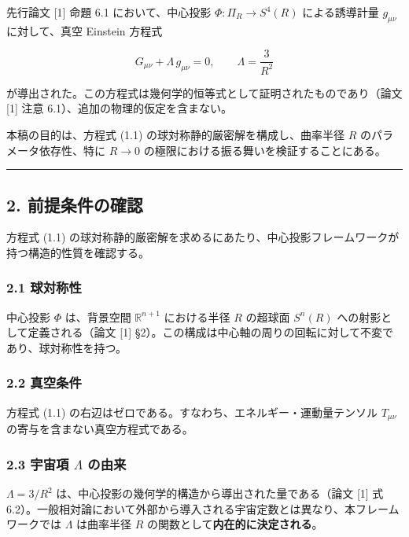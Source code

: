 \documentclass[a4paper,11pt]{ltjsarticle}
\theoremstyle{definition}
\begin{document}
先行論文 {[}1{]} 命題 6.1 において、中心投影 \(\Phi : \Pi_R \to S^4(R)\)
による誘導計量 \(g_{\mu\nu}\) に対して、真空 Einstein 方程式

\[G_{\mu\nu} + \Lambda\, g_{\mu\nu} = 0, \qquad \Lambda = \frac{3}{R^2} \tag{1.1}\]

が導出された。この方程式は幾何学的恒等式として証明されたものであり（論文
{[}1{]} 注意 6.1）、追加の物理的仮定を含まない。

本稿の目的は、方程式 (1.1) の球対称静的厳密解を構成し、曲率半径 \(R\)
のパラメータ依存性、特に \(R \to 0\)
の極限における振る舞いを検証することにある。

\begin{center}\rule{0.5\linewidth}{0.5pt}\end{center}

\subsection{2.
前提条件の確認}\label{ux524dux63d0ux6761ux4ef6ux306eux78baux8a8d}

方程式 (1.1)
の球対称静的厳密解を求めるにあたり、中心投影フレームワークが持つ構造的性質を確認する。

\subsubsection{2.1 球対称性}\label{ux7403ux5bfeux79f0ux6027}

中心投影 \(\Phi\) は、背景空間 \(\mathbb{R}^{n+1}\) における半径 \(R\)
の超球面 \(S^n(R)\) への射影として定義される（論文 {[}1{]}
§2）。この構成は中心軸の周りの回転に対して不変であり、球対称性を持つ。

\subsubsection{2.2 真空条件}\label{ux771fux7a7aux6761ux4ef6}

方程式 (1.1) の右辺はゼロである。すなわち、エネルギー・運動量テンソル
\(T_{\mu\nu}\) の寄与を含まない真空方程式である。

\subsubsection{\texorpdfstring{2.3 宇宙項 \(\Lambda\)
の由来}{2.3 宇宙項 \textbackslash Lambda の由来}}\label{ux5b87ux5b99ux9805-lambda-ux306eux7531ux6765}

\(\Lambda = 3/R^2\)
は、中心投影の幾何学的構造から導出された量である（論文 {[}1{]} 式
6.2）。一般相対論において外部から導入される宇宙定数とは異なり、本フレームワークでは
\(\Lambda\) は曲率半径 \(R\) の関数として\textbf{内在的に決定される}。
\end{document}
